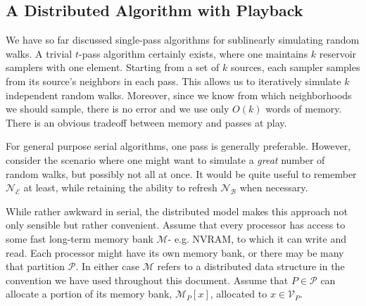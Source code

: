 \documentclass[10]{article}
\begin{document}
%
%



\subsection{A Distributed Algorithm with Playback}
 \label{walks:sec:walks:distributed:playback}

We have so far discussed single-pass algorithms for sublinearly simulating random walks. 
A trivial $t$-pass algorithm certainly exists, where one maintains $k$ reservoir samplers  with one element. 
Starting from a set of $k$ sources, each sampler samples from its source's neighbors in each pass. 
This allows us to iteratively simulate $k$ independent random walks. 
Moreover, since we know from which neighborhoods we should sample, there is no error and we use only $O(k)$ words of memory.
There is an obvious tradeoff between memory and passes at play.

For general purpose serial algorithms, one pass is generally preferable.
However, consider the scenario where one might want to simulate a \emph{great} number of random walks, but possibly not all at once.
It would be quite useful to remember $\mathcal{N}_\mathcal{E}$ at least, while retaining the ability to refresh $\mathcal{N}_\mathcal{B}$ when necessary.

While rather awkward in serial, the distributed model makes this approach not only sensible but rather convenient. 
Assume that every processor has access to some fast long-term memory bank $\mathcal{M}$- e.g. NVRAM, to which it can write and read.
Each processor might have its own memory bank, or there may be many that partition $\mathcal{P}$.
In either case $\mathcal{M}$ refers to a distributed data structure in the convention we have used throughout this document.
Assume that $P \in \mathcal{P}$ can allocate a portion of its memory bank, $\mathcal{M}_P[x]$, allocated to $x \in \mathcal{V}_P$.
\end{document}
